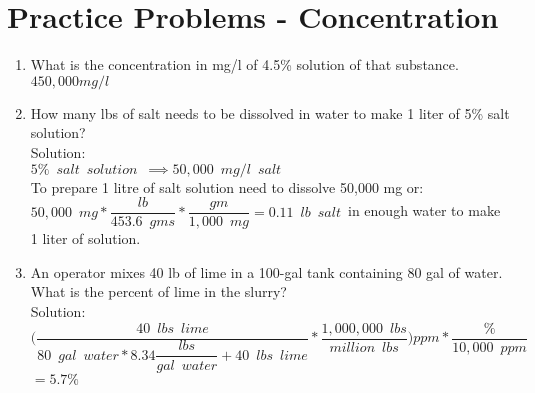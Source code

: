 \section*{Practice Problems - Concentration} 
\begin{enumerate}
\item What is the concentration in mg/l of  4.5\% solution of that substance.\\
$\boxed{450,000mg/l}$
\vspace{0.3cm}
\item How many lbs of salt needs to be dissolved in water to make 1 liter of 5\% salt solution?\\
Solution:\\
$5\% \enspace salt \enspace solution \enspace \implies 50,000 \enspace mg/l \enspace salt$\\
To prepare 1 litre of salt solution need to dissolve 50,000 mg or:\\
$50,000 \enspace mg*\dfrac{lb}{453.6 \enspace gms}*\dfrac{gm}{1,000 \enspace mg}=\boxed{0.11 \enspace lb \enspace salt}\enspace$in enough  water to make 1 liter of solution.\\
\vspace{0.3cm}
\item An operator mixes 40 lb of lime in a 100-gal tank containing 80 gal of water. What is the percent of lime in the slurry?\\
\vspace{0.2cm}
Solution:\\
\vspace{0.2cm}
$\Bigg(\dfrac{40 \enspace lbs \enspace lime}{80 \enspace gal \enspace water*8.34\dfrac{lbs}{gal \enspace water}+40\enspace lbs \enspace lime}*\dfrac{1,000,000 \enspace lbs}{million \enspace lbs}\Bigg)ppm*\dfrac{\%}{10,000 \enspace ppm}$\\
\vspace{0.2cm}
$=\boxed{5.7\%}$


\end{enumerate}

